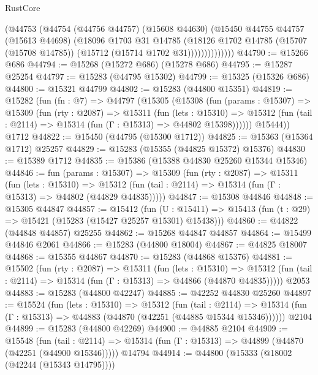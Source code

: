 \begin{lexlean}{RustCore}
\begin{coremodule}
                  (@44753
                    (@44754
                      (@44756 @44757)
                      (@15608 @44630)
                      (@15450
                        @44755
                        @44757
                        (@15613 @44698)
                        (@18096
                          @1703
                          @31
                          @14785
                          (@18126
                            @1702
                            @14785
                            (@15707 (@15708 @14785))
                            (@15712 (@15714 @1702 @31))))))))))))))
@44790 := @15266 @686
@44794 := @15268 (@15272 @686) (@15278 @686)
@44795 := @15287 @25254
@44797 := @15283 (@44795 @15302)
@44799 := @15325 (@15326 @686)
@44800 := @15321 @44799
@44802 := @15283 (@44800 @15351)
@44819 := @15282
    (fun (fn : @7) =>
    @44797
      (@15305
        (@15308
          (fun (params : @15307) =>
          @15309
            (fun (rty : @2087) =>
            @15311
              (fun (lets : @15310) =>
              @15312 (fun (tail : @2114) => @15314 (fun (Γ : @15313) => @44802 @15398))))))
        @15444))
    @1712
@44822 := @15450 (@44795 (@15300 @1712))
@44825 := @15363 (@15364 @1712) @25257
@44829 := @15283 (@15355 (@44825 @15372) @15376)
@44830 := @15389 @1712
@44835 := @15386 (@15388 @44830 @25260 @15344 @15346)
@44846 := fun (params : @15307) =>
  @15309
    (fun (rty : @2087) =>
    @15311
      (fun (lets : @15310) =>
      @15312 (fun (tail : @2114) => @15314 (fun (Γ : @15313) => @44802 (@44829 @44835)))))
@44847 := @15308 @44846
@44848 := @15305 @44847
@44857 := @15412
    (fun (U : @15411) => @15413 (fun (t : @29) => @15421 (@15283 (@15427 @25257 @15301) @15438)))
@44860 := @44822 (@44848 @44857) @25255
@44862 := @15268 @44847 @44857
@44864 := @15499 @44846 @2061
@44866 := @15283 (@44800 @18004)
@44867 := @44825 @18007
@44868 := @15355 @44867
@44870 := @15283 (@44868 @15376)
@44881 := @15502
    (fun (rty : @2087) =>
    @15311
      (fun (lets : @15310) =>
      @15312 (fun (tail : @2114) => @15314 (fun (Γ : @15313) => @44866 (@44870 @44835)))))
    @2053
@44883 := @15283 (@44800 @42247)
@44885 := @42252 @44830 @25260
@44897 := @15524
    (fun (lets : @15310) =>
    @15312
      (fun (tail : @2114) =>
      @15314 (fun (Γ : @15313) => @44883 (@44870 (@42251 (@44885 @15344 @15346))))))
    @2104
@44899 := @15283 (@44800 @42269)
@44900 := @44885 @2104
@44909 := @15548
    (fun (tail : @2114) => @15314 (fun (Γ : @15313) => @44899 (@44870 (@42251 (@44900 @15346)))))
    @14794
@44914 := @44800 (@15333 (@18002 (@42244 (@15343 @14795))))

\end{coremodule}
\end{lexlean}
